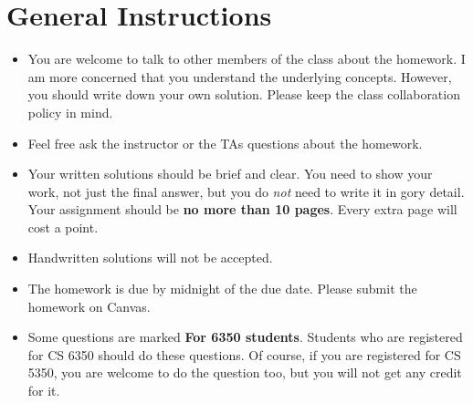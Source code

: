 \section*{General Instructions}

{\footnotesize
  \begin{itemize}
  \item You are welcome to talk to other members of the class about
    the homework. I am more concerned that you understand the
    underlying concepts. However, you should write down your own
    solution. Please keep the class collaboration policy in mind.

  \item Feel free ask the instructor or the TAs questions about the
    homework.

  \item Your written solutions should be brief and clear. You need to
    show your work, not just the final answer, but you do \emph{not}
    need to write it in gory detail. Your assignment should be {\bf no
      more than 10 pages}. Every extra page will cost a point.

  \item Handwritten solutions will not be accepted.

  \item The homework is due by midnight of the due date. Please submit
    the homework on Canvas.

  \item Some questions are marked {\bf For 6350 students}. Students
    who are registered for CS 6350 should do these questions. Of
    course, if you are registered for CS 5350, you are welcome to do
    the question too, but you will not get any credit for it.

  \end{itemize}
}

